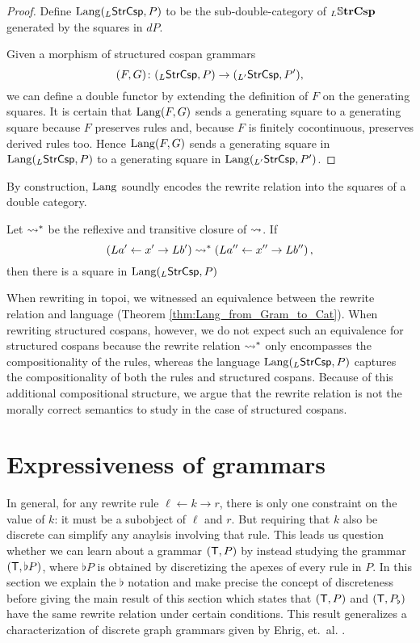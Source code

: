 \documentclass{amsart}
\begin{document}
\begin{proof}
  Define $\mathrm{Lang} (_L\mathsf{StrCsp},P)$ to be the
  sub-double-category of $_L\mathbb{S} \mathbf{trCsp}$ generated
  by the squares in $dP$.
  
  Given a morphism of structured cospan grammars
  $$(F,G) \colon (_L\mathsf{StrCsp},P) \to (_{L'}\mathsf{StrCsp},P'),$$ we
  can define a double functor by extending the definition of
  $F$ on the generating squares. It is certain that
  $\mathrm{Lang} (F,G)$ sends a generating square to a generating
  square because $F$ preserves rules and, because $F$ is
  finitely cocontinuous, preserves derived rules too.  Hence
  $\mathrm{Lang} (F,G)$ sends a generating square in
  $\mathrm{Lang} (_{L}\mathsf{StrCsp},P)$ to a generating square in
  $\mathrm{Lang} (_{L'}\mathsf{StrCsp},P')$.
\end{proof}

By construction, $ \mathrm{Lang} $ soundly
encodes the rewrite relation into the squares of a
double category.

\begin{corollary}
  \label{thm:StrCspLang_Encodes_RewrRel}
  Let $ \rightsquigarrow^\ast $ be the reflexive and
  transitive closure of $ \rightsquigarrow $.  If
  $$ \left(La' \leftarrow x' \to Lb'\right) \rightsquigarrow^\ast \left(La'' \leftarrow x'' \to Lb''\right), $$ then there is a square
   in
  $ \mathrm{Lang} ({}_L\mathsf{StrCsp}, P) $
\end{corollary}

When rewriting in topoi, we witnessed an
equivalence between the rewrite relation and
language (Theorem
\ref{thm:Lang_from_Gram_to_Cat}). When rewriting
structured cospans, however, we do not expect such
an equivalence for structured cospans because the
rewrite relation $ \rightsquigarrow^\ast $ only encompasses
the compositionality of the rules, whereas the
language $ \mathrm{Lang} (_L\mathsf{StrCsp},P) $ captures the
compositionality of both the rules and structured
cospans. Because of this additional compositional
structure, we argue that the rewrite relation is
not the morally correct semantics to study in the
case of structured cospans. 

\section{Expressiveness of grammars}
\label{sec:gen-result-graph-rewriting}

In general, for any rewrite rule
$ \ell \gets k \to r $, there is only one
constraint on the value of $ k $: it must be a
subobject of $ \ell $ and $ r $.  But requiring
that $ k $ also be discrete can simplify
any anaylsis involving that rule. This leads us
question whether we can learn about a grammar
$ ( \mathsf{T},P ) $ by instead studying the grammar
$ ( \mathsf{T}, \flat P ) $, where $ \flat P $ is obtained
by discretizing the apexes of every rule in $ P
$. In this section we explain the $ \flat $
notation and make precise the concept of
discreteness before giving the main result of this
section which states that $ ( \mathsf{T},P ) $ and
$ ( \mathsf{T}, P_\flat  ) $ have the same rewrite relation
under certain conditions.  This result generalizes
a characterization of discrete graph grammars
given by Ehrig,
et.~al. \cite[Prop.~3.3]{Ehrig_GraphGram}.
\end{document}
